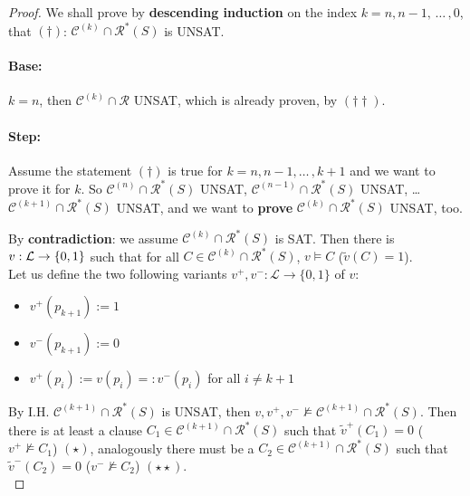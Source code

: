 \begin{proof}
\noindent
We shall prove by \textbf{descending induction} on the index $k = n, n-1, \, \dots \, , 0$, that $(\dag)$: $\mathcal{C}^{(k)} \cap \mathcal{R}^\ast (S)$ is UNSAT.

\vspace{-0.25cm}

\paragraph{Base:} $k=n$, then $\mathcal{C}^{(k)} \cap \mathcal{R}$ UNSAT, which is already proven, by $(\dag\dag)$.

\vspace{-0.25cm}

\paragraph{Step:} Assume the statement $(\dag)$ is true for $k=n, n-1, \dots \, , k+1$ and we want to prove it for $k$. So $\mathcal{C}^{(n)} \cap \mathcal{R}^\ast (S)$ UNSAT, $\mathcal{C}^{(n-1)} \cap \mathcal{R}^\ast (S)$ UNSAT, \dots  $\mathcal{C}^{(k+1)} \cap \mathcal{R}^\ast (S)$ UNSAT, and we want to \textbf{prove} $\mathcal{C}^{(k)} \cap \mathcal{R}^\ast (S)$ UNSAT, too.

By \textbf{contradiction}: we assume $\mathcal{C}^{(k)} \cap \mathcal{R}^\ast (S)$ is SAT. Then there is $v: \mathcal{L} \rightarrow \{0,1\}$ such that for all $C \in \mathcal{C}^{(k)} \cap \mathcal{R}^\ast (S)$, $v \models C$ ($\tilde v(C) = 1$).\\

\noindent
Let us define the two following variants $v^+, v^- : \mathcal{L} \rightarrow \{0,1\}$ of $v$:
\begin{itemize}
	\item $v^+ (p_{k+1}) := 1$
	\item $v^- (p_{k+1}) := 0$
	\item $v^+ (p_i) := v(p_i) =: v^- (p_i)$ for all $i \neq k+1$
\end{itemize}

\noindent
By I.H. $\mathcal{C}^{(k+1)} \cap \mathcal{R}^\ast (S)$ is UNSAT, then $v, v^+, v^- \not \models \mathcal{C}^{(k+1)} \cap \mathcal{R}^\ast (S)$. Then there is at least a clause $C_1 \in \mathcal{C}^{(k+1)} \cap \mathcal{R}^\ast (S)$ such that $\tilde v^+ (C_1) = 0$ ($v^+ \not \models C_1$) $(\star)$, analogously there must be a $C_2 \in \mathcal{C}^{(k+1)} \cap \mathcal{R}^\ast (S)$ such that $\tilde v^- (C_2) = 0$ ($v^- \not \models C_2$) $(\star \star)$.\\


\end{proof}
